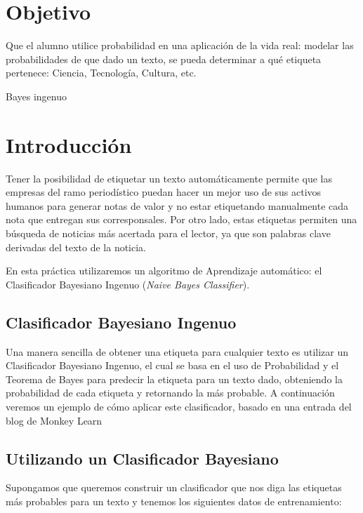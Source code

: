 \section{Objetivo}
Que el alumno utilice probabilidad en una aplicación de la vida real: modelar las probabilidades de que dado un texto, se pueda determinar a qué etiqueta pertenece: Ciencia, Tecnología, Cultura, etc. \par


\begin{auxcode}
 \caption{Bayes ingenuo}
 \centering
\end{auxcode}

\section{Introducción} 

Tener la posibilidad de etiquetar un texto automáticamente permite que las empresas del ramo periodístico puedan hacer un mejor uso de sus activos humanos para generar notas de valor y no estar etiquetando manualmente cada nota que entregan sus corresponsales. Por otro lado, estas etiquetas permiten una búsqueda de noticias más acertada para el lector, ya que son palabras clave derivadas del texto de la noticia.

En esta práctica utilizaremos un algoritmo de Aprendizaje automático: el Clasificador Bayesiano Ingenuo (\textit{Naive Bayes Classifier}).

\subsection{Clasificador Bayesiano Ingenuo}

Una manera sencilla de obtener una etiqueta para cualquier texto es utilizar un Clasificador Bayesiano Ingenuo, el cual se basa en el uso de Probabilidad y el Teorema de Bayes para predecir la etiqueta para un texto dado, obteniendo la probabilidad de cada etiqueta y retornando la más probable. A continuación veremos un ejemplo de cómo aplicar este clasificador, basado en una entrada del blog de Monkey Learn \parencite{Stecanella2017}


\subsection{Utilizando un Clasificador Bayesiano}

Supongamos que queremos construir un clasificador que nos diga las etiquetas más probables para un texto y tenemos los siguientes datos de entrenamiento:

